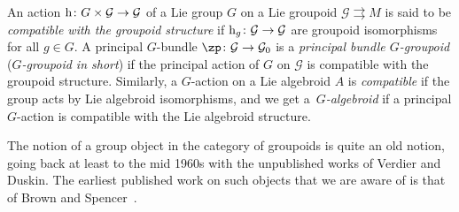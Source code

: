 \documentclass[pdftex]{sigma}
\newcommand{\rmh}{\textnormal{h}}
\newcommand{\ti}{\times}
\def\cG{\mathcal{G}}
\numberwithin{equation}{section}
\begin{document}
\begin{Definition}\label{d1} An action $\rmh\colon G\ti\cG\to\cG$ of a Lie group $G$ on a Lie groupoid $\cG\rightrightarrows M$ is said to be \emph{compatible with the groupoid structure} if $\rmh_g\colon \cG\to\cG$ are groupoid isomorphisms for all $g\in G$. A principal $G$-bundle $\zp\colon \cG\to\cG_0$ is a \emph{principal bundle $G$-groupoid} (\emph{$G$-groupoid in short}) if the principal action of $G$ on $\cG$ is compatible with the groupoid structure. Similarly, a $G$-action on a Lie algebroid $A$ is \emph{compatible} if the group acts by Lie algebroid isomorphisms, and we get a~\emph{$G$-algebroid} if a principal $G$-action is compatible with the Lie algebroid structure.
\end{Definition}

\begin{Remark}The notion of a group object in the category of groupoids is quite an old notion, going back at least to the mid 1960s with the unpublished works of Verdier and Duskin. The earliest published work on such objects that we are aware of is that of Brown and Spencer~\cite{Brown:1976}.
\end{Remark}
\end{document}
